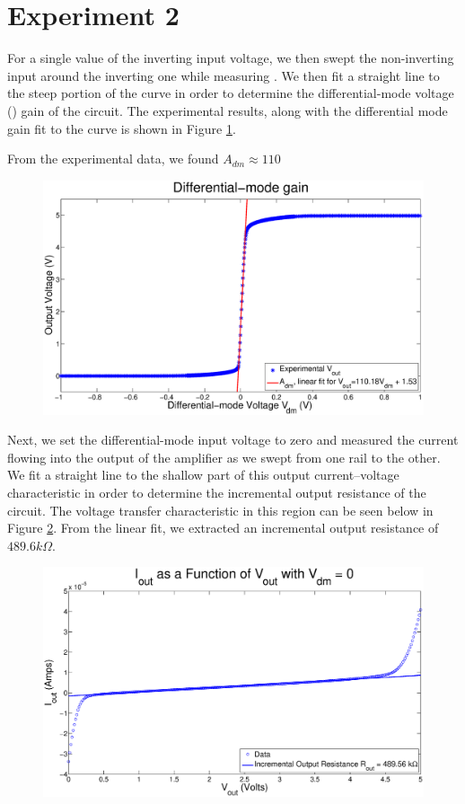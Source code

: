\section*{Experiment 2}

For a single value of the inverting input voltage, we then swept the
non-inverting input around the inverting one while measuring \Vout. We then fit
a straight line to the steep portion of the curve in order to determine the
differential-mode voltage (\Adm) gain of the circuit. The experimental results,
along with the differential mode gain fit to the curve is shown in Figure
\ref{fig:exp2p1}.

From the experimental data, we found $A_{dm} \approx 110$
\begin{figure}[H]
\centering
\includegraphics[width=\linewidth]{../Figures/Exp2P1.eps}
\caption{}
\label{fig:exp2p1}
\end{figure}

Next, we set the differential-mode input voltage to zero and measured the
current flowing into the output of the amplifier as we swept \Vout from one
rail to the other. We fit a straight line to the shallow part of this output
current–voltage characteristic in order to determine the incremental output
resistance of the circuit. The voltage transfer characteristic in this region
can be seen below in Figure \ref{fig:exp2p2}.
From the linear fit, we extracted an incremental output resistance of $489.6k\Omega$.

\begin{figure}[H]
\centering
\includegraphics[width=\linewidth]{../Figures/Exp2P2.eps}
\caption{}
\label{fig:exp2p2}
\end{figure}

